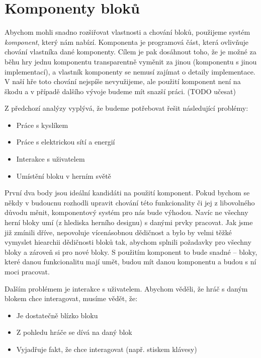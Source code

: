 


\section{Komponenty bloků}

Abychom mohli snadno rozšiřovat vlastnosti a chování bloků, použijeme systém \textit{komponent}, který nám \UE{} nabízí. Komponenta je programová část, která ovlivňuje chování vlastníka dané komponenty. Cílem je pak dosáhnout toho, že je možné za běhu hry jednu komponentu transparentně vyměnit za jinou (komponentu s jinou implementací), a vlastník komponenty se nemusí zajímat o detaily implementace. V naší hře toto chování nejspíše nevyužijeme, ale použití komponent není na škodu a v případě dalšího vývoje budeme mít snazší práci. (TODO učesat)

Z předchozí analýzy vyplývá, že budeme potřebovat řešit následující problémy:

\begin{itemize}
	\item Práce s kyslíkem
	\item Práce s elektrickou sítí a energií
	\item Interakce s uživatelem
	\item Umístění bloku v herním světě
\end{itemize}


První dva body jsou ideální kandidáti na použití komponent. Pokud bychom se někdy v budoucnu rozhodli upravit chování této funkcionality či jej z libovolného důvodu měnit, komponentový systém pro nás bude výhodou. Navíc ne všechny herní bloky umí (z hlediska herního designu) s danými prvky pracovat. Jak jsme již zmínili dříve, \UE{} nepovoluje vícenásobnou dědičnost a bylo by velmi těžké vymyslet hiearchii dědičnosti bloků tak, abychom splnili požadavky pro všechny bloky a zároveň si  pro nové bloky. S použitím komponent to bude snadné -- bloky, které danou funkcionalitu mají umět, budou mít danou komponentu a budou s ní moci pracovat.

Dalším problémem je interakce s uživatelem. Abychom věděli, že hráč s daným blokem chce interagovat, musíme vědět, že:
\begin{itemize}
	\item Je dostatečně blízko bloku
	\item Z pohledu hráče se dívá na daný blok 
	\item Vyjadřuje fakt, že chce interagovat (např. stiskem klávesy)
\end{itemize}


